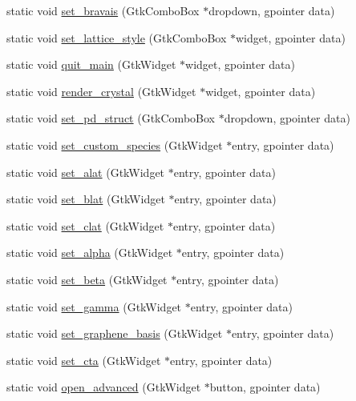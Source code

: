 \begin{DoxyCompactItemize}
static void \hyperlink{class_gui_a1143cda5695a043bb2a4f071f1cded77}{set\+\_\+bravais} (Gtk\+Combo\+Box $\ast$dropdown, gpointer data)
\item 
static void \hyperlink{class_gui_a05621e2bb9936636caf3128d1611827a}{set\+\_\+lattice\+\_\+style} (Gtk\+Combo\+Box $\ast$widget, gpointer data)
\item 
static void \hyperlink{class_gui_a334a7a04a6c00f24abddfa94de8f10ce}{quit\+\_\+main} (Gtk\+Widget $\ast$widget, gpointer data)
\item 
static void \hyperlink{class_gui_aa8edfa548ee3ebcb325c43086b196fe0}{render\+\_\+crystal} (Gtk\+Widget $\ast$widget, gpointer data)
\item 
static void \hyperlink{class_gui_a61dd19b2b81db0839543802814d7f49e}{set\+\_\+pd\+\_\+struct} (Gtk\+Combo\+Box $\ast$dropdown, gpointer data)
\item 
static void \hyperlink{class_gui_af78ce4976f95571adaf5260fe140337d}{set\+\_\+custom\+\_\+species} (Gtk\+Widget $\ast$entry, gpointer data)
\item 
static void \hyperlink{class_gui_a2ef155d1b6279e72dabdb2ce0fa03e59}{set\+\_\+alat} (Gtk\+Widget $\ast$entry, gpointer data)
\item 
static void \hyperlink{class_gui_abd57037f5c09c0ea7f20264fbdd630ca}{set\+\_\+blat} (Gtk\+Widget $\ast$entry, gpointer data)
\item 
static void \hyperlink{class_gui_aada6cadb96bb3b486efa192e5e5f8b51}{set\+\_\+clat} (Gtk\+Widget $\ast$entry, gpointer data)
\item 
static void \hyperlink{class_gui_a4e7013cc9f0d4bbe495311fc94643342}{set\+\_\+alpha} (Gtk\+Widget $\ast$entry, gpointer data)
\item 
static void \hyperlink{class_gui_ad4cb1cb7fb9df0a9681ab4f90f47561f}{set\+\_\+beta} (Gtk\+Widget $\ast$entry, gpointer data)
\item 
static void \hyperlink{class_gui_a453aa0ae8fc7a1563c77af6210e31385}{set\+\_\+gamma} (Gtk\+Widget $\ast$entry, gpointer data)
\item 
static void \hyperlink{class_gui_a0a5d7e785101e584a6c1e5bfd6dc3fd0}{set\+\_\+graphene\+\_\+basis} (Gtk\+Widget $\ast$entry, gpointer data)
\item 
static void \hyperlink{class_gui_a09d25819dce6dfe57c3204778394b3b9}{set\+\_\+cta} (Gtk\+Widget $\ast$entry, gpointer data)
\item 
static void \hyperlink{class_gui_ab31975e08d40ee52c8c5ce6f74b983ff}{open\+\_\+advanced} (Gtk\+Widget $\ast$button, gpointer data)

\end{DoxyCompactItemize}
